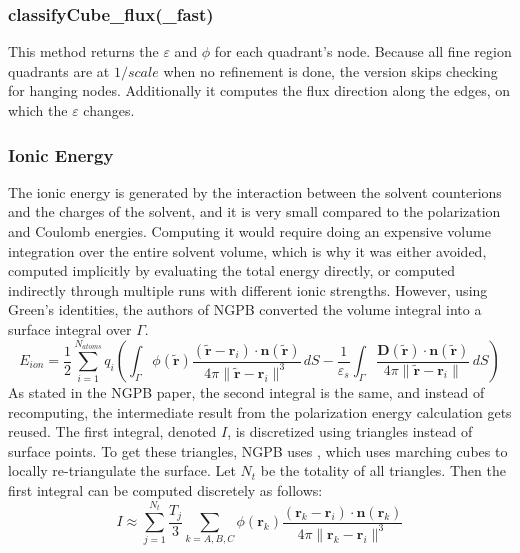 \subsubsection{classifyCube\_flux(\_fast)}

This method returns the $\varepsilon$ and $\phi$ for each quadrant's node.
Because all fine region quadrants are at $1/scale$ when no refinement is done, the  version skips checking for hanging nodes.
Additionally it computes the flux direction along the edges, on which the $\varepsilon$ changes.

\subsubsection{Ionic Energy}

The ionic energy is generated by the interaction between the solvent counterions and the charges of the solvent, and it is very small compared to the polarization and Coulomb energies.
Computing it would require doing an expensive volume integration over the entire solvent volume, which is why it was either avoided, computed implicitly by evaluating the total energy directly, or computed indirectly through multiple runs with different ionic strengths.
However, using Green's identities, the authors of NGPB converted the volume integral into a surface integral over $\Gamma$.
\begin{equation}
    E_{ion} = \frac{1}{2} \sum_{i=1}^{N_{atoms}} q_i \left( \int_{\Gamma} \phi(\tilde{\mathbf{r}}) \frac{(\tilde{\mathbf{r}} - \mathbf{r}_i) \cdot \mathbf{n}(\tilde{\mathbf{r}})}{4\pi \lVert \tilde{\mathbf{r}} - \mathbf{r}_i \rVert^3} \, dS - \frac{1}{\varepsilon_s} \int_{\Gamma} \frac{\mathbf{D}(\tilde{\mathbf{r}}) \cdot \mathbf{n}(\tilde{\mathbf{r}})}{4\pi \lVert \tilde{\mathbf{r}} - \mathbf{r}_i \rVert} \, dS \right)
    \label{eq:ionic-energy}
\end{equation}
As stated in the NGPB paper, the second integral is the same, and instead of recomputing, the intermediate result from the polarization energy calculation gets reused.
The first integral, denoted $I$, is discretized using triangles instead of surface points.
To get these triangles, NGPB uses , which uses marching cubes to locally re-triangulate the surface.
Let $N_t$ be the totality of all triangles.
Then the first integral can be computed discretely as follows:
\begin{equation}
    I \approx \sum_{j=1}^{N_t} \frac{T_j}{3} \sum_{k=A,B,C} \phi(\mathbf{r}_k) \frac{(\mathbf{r}_k - \mathbf{r}_i) \cdot \mathbf{n}(\mathbf{r}_k)}{4\pi \lVert \mathbf{r}_k - \mathbf{r}_i \rVert^3}
    \label{eq:ionic-energy-discrete}
\end{equation}
